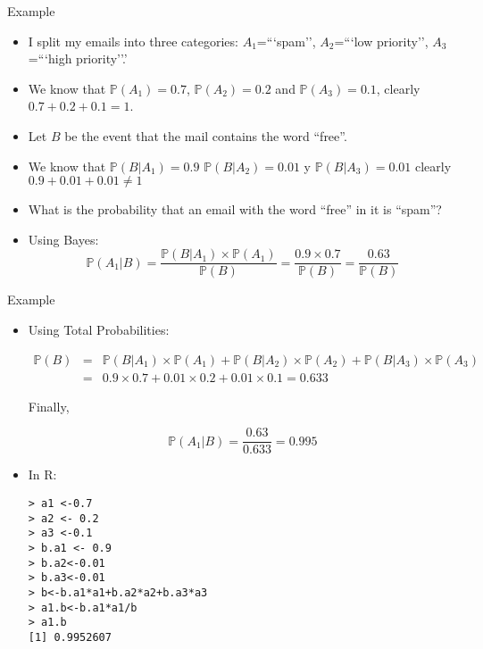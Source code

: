 \documentclass[handout]{beamer}
\begin{document}
\begin{frame}{Example}
\scriptsize{
\begin{itemize}
 \item I split my emails into three categories: $A_1$=```spam'', $A_2$=```low priority'', $A_3$=```high priority''.'
 \item We know that $\mathbb{P}(A_1)=0.7$, $\mathbb{P}(A_2)=0.2$ and $\mathbb{P}(A_3)=0.1$, clearly $0.7+0.2+0.1=1$.
 \item Let $B$ be the event that the mail contains the word ``free''.
 \item We know that $\mathbb{P}(B|A_1)=0.9$ $\mathbb{P}(B|A_2)=0.01$ y $\mathbb{P}(B|A_3)=0.01$ clearly $0.9+0.01+0.01 \neq 1$
 \item  What is the probability that an email with the word ``free'' in it is ``spam''?
 \item Using Bayes:
 \begin{displaymath}
   \mathbb{P}(A_1|B) = \frac{\mathbb{P}(B|A_1)\times \mathbb{P}(A_1)}{\mathbb{P}(B)} = \frac{0.9 \times 0.7}{\mathbb{P}(B)} = \frac{0.63}{\mathbb{P}(B)}
 \end{displaymath}

 
\end{itemize}


} 
\end{frame}

\begin{frame}[fragile]{Example}
\scriptsize{
\begin{itemize}
 \item Using Total Probabilities:
 
  \begin{eqnarray*}
  \mathbb{P}(B) & = & \mathbb{P}(B|A_1)\times\mathbb{P}(A_1)+\mathbb{P}(B|A_2)\times\mathbb{P}(A_2)+\mathbb{P}(B|A_3)\times\mathbb{P}(A_3) \\
  & = & 0.9 \times 0.7 + 0.01 \times 0.2 + 0.01 \times 0.1 = 0.633
 \end{eqnarray*}

Finally,  


 
 
 \begin{displaymath}
  \mathbb{P}(A_1|B) = \frac{0.63}{0.633} = 0.995
 \end{displaymath}

\item In R:
\begin{verbatim}
> a1 <-0.7
> a2 <- 0.2
> a3 <-0.1
> b.a1 <- 0.9 
> b.a2<-0.01
> b.a3<-0.01
> b<-b.a1*a1+b.a2*a2+b.a3*a3
> a1.b<-b.a1*a1/b
> a1.b
[1] 0.9952607 
\end{verbatim}


\end{itemize}




} 
\end{frame}
\end{document}
